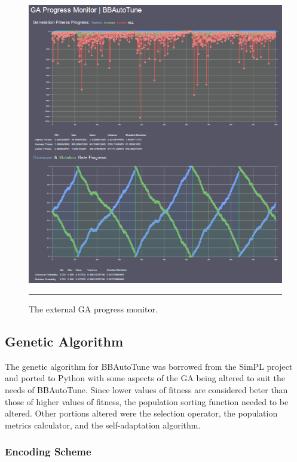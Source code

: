 \begin{figure}[ht!]
\centering
\includegraphics[scale=0.6]{../Figures/Chapter4/ga_monitor.png}
\rule{35em}{0.5pt}
\caption[GA Progress Monitor]{The external GA progress monitor.}
\label{fig:ga_monitor}
\end{figure}

\subsection{Genetic Algorithm}

The genetic algorithm for BBAutoTune was borrowed from the SimPL project and ported to Python with some aspects of the GA being altered to suit the needs of BBAutoTune. Since lower values of fitness are considered beter than those of higher values of fitness, the population sorting function needed to be altered. Other portions altered were the selection operator, the population metrics calculator, and the self-adaptation algorithm.  

\subsubsection{Encoding Scheme}

